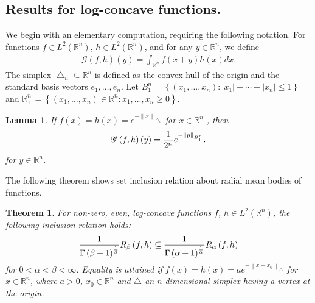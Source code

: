 \documentclass[preprint,12pt]{elsarticle}
\newtheorem{thm}{Theorem}
\newtheorem{lem}{Lemma}
\begin{document}
\subsection{Results for log-concave functions.}
We begin with an elementary computation, requiring the following notation. For functions $f\in L^{2}\left ( \mathbb{R}^n  \right )$,  $h\in L^{2}\left ( \mathbb{R}^n  \right )$, and for any $y\in \mathbb{R}^n $, we define 
\begin{eqnarray}\label{e7.1}
\mathscr{G}\left ( f,h \right )\left ( y \right )=\int_{\mathbb{R}^n }f\left ( x+y \right )h\left ( x \right )dx.
\end{eqnarray}
The simplex $\bigtriangleup _{n}\subseteq \mathbb{R}^n $ is defined as the convex hull of the origin and the standard basis vectors $e_{1},\dots ,e_{n} $. Let $B^{n} _{1}=\left \{ \left ( x_{1},\dots ,x_{n}   \right ):\left | x_{1}  \right |+ \cdots+\left | x_{n}  \right |\le 1     \right \}$ and $\mathbb{R}^n _{+}=\left \{  \left ( x_{1},\dots ,x_{n}   \right )\in \mathbb{R}^n: x_{1},\dots ,x_{n} \ge 0 \right \} $.
\begin{lem}\cite[Lemma 18]{JM22}\label{7.3}
If $f\left ( x \right )=h\left ( x \right )=e^{-\left \| x \right \|_{\bigtriangleup_{n} }  }$ for $x\in \mathbb{R}^n$ , then
\begin{eqnarray}
\mathscr{G}\left ( f,h \right )\left ( y \right )=\frac{1}{2^{n} }e^{-\left \| y \right \|_{B^{n} _{1} }  }.\notag
\end{eqnarray}
for $y\in \mathbb{R}^n $.
\end{lem}
The following theorem shows set inclusion relation about radial mean bodies of functions.
\begin{thm}\label{5.3}
For non-zero, even, log-concave functions $f$, $h\in L^{2}\left ( \mathbb{R}^n  \right )$, the following inclusion relation holds:
\begin{eqnarray}
\frac{1}{\Gamma \left ( \beta +1 \right )^{\frac{1}{\beta } }  }R_{\beta }\left ( f,h \right )\subseteq \frac{1}{\Gamma \left ( \alpha  +1 \right )^{\frac{1}{\alpha } }  }R_{\alpha  }\left ( f,h \right )\notag
\end{eqnarray}
for $0< \alpha < \beta < \infty$. Equality is attained if $f\left ( x \right )=h\left ( x \right )=ae^{-\left \| x-x_{0}  \right \|_{\bigtriangleup}}$ for $x\in \mathbb{R}^n$, where $a > 0$, $x_{0}\in \mathbb{R}^n$ and $\bigtriangleup $ an $n$-dimensional simplex having a vertex at the origin. 
\end{thm}
\end{document}

